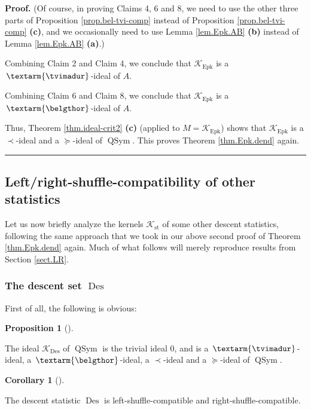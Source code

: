 \documentclass[numbers=enddot,12pt,final,onecolumn,notitlepage]{scrartcl}%
\theoremstyle{definition}
\newtheorem{prop}[theo]{Proposition}
\newenvironment{proposition}[1][]
{\begin{prop}[#1]\begin{leftbar}}
{\end{leftbar}\end{prop}}
\newtheorem{coro}[theo]{Corollary}
\newenvironment{corollary}[1][]
{\begin{coro}[#1]\begin{leftbar}}
{\end{leftbar}\end{coro}}
\newenvironment{proof}[1][Proof]{\noindent\textbf{#1.} }{\ \rule{0.5em}{0.5em}}
\newenvironment{verlong}{}{}
\newcommand{\tvi}{\left. \textarm{\tvimadur} \right.}
\newcommand{\bel}{\left. \textarm{\belgthor} \right.}
\begin{document}
\begin{verlong}
\begin{proof}
(Of course, in proving Claims 4, 6 and 8, we need to use the other three parts
of Proposition \ref{prop.bel-tvi-comp} instead of Proposition
\ref{prop.bel-tvi-comp} \textbf{(c)}, and we occasionally need to use Lemma
\ref{lem.Epk.AB} \textbf{(b)} instead of Lemma \ref{lem.Epk.AB} \textbf{(a)}.)

Combining Claim 2 and Claim 4, we conclude that $\mathcal{K}%
_{\operatorname*{Epk}}$ is a $\tvi$-ideal of $A$.

Combining Claim 6 and Claim 8, we conclude that $\mathcal{K}%
_{\operatorname*{Epk}}$ is a $\bel$-ideal of $A$.

Thus, Theorem \ref{thm.ideal-crit2} \textbf{(c)} (applied to $M=\mathcal{K}%
_{\operatorname*{Epk}}$) shows that $\mathcal{K}_{\operatorname*{Epk}}$ is a
$\left.  \prec\right.  $-ideal and a $\left.  \succeq\right.  $-ideal of
$\operatorname*{QSym}$. This proves Theorem \ref{thm.Epk.dend} again.
\end{proof}

\subsection{\label{subsect.dendri.other-stats}Left/right-shuffle-compatibility
of other statistics}

Let us now briefly analyze the kernels $\mathcal{K}_{\operatorname*{st}}$ of
some other descent statistics, following the same approach that we took in our
above second proof of Theorem \ref{thm.Epk.dend} again. Much of what follows
will merely reproduce results from Section \ref{sect.LR}.

\subsubsection{The descent set $\operatorname*{Des}$}

First of all, the following is obvious:

\begin{proposition}
\label{prop.Des-set.dend}The ideal $\mathcal{K}_{\operatorname*{Des}}$ of
$\operatorname*{QSym}$ is the trivial ideal $0$, and is a $\tvi$-ideal, a
$\bel$-ideal, a $\left.  \prec\right.  $-ideal and a $\left.  \succeq\right.
$-ideal of $\operatorname*{QSym}$.
\end{proposition}

\begin{corollary}
\label{cor.dendri.Des-set}The descent statistic $\operatorname*{Des}$ is
left-shuffle-compatible and right-shuffle-compatible.
\end{corollary}


\end{verlong}
\end{document}
